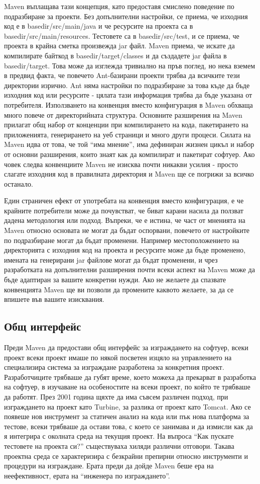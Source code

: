 Maven въплащава тази концепция, като предоставя смислено поведение по
подразбиране за проекти. Без допълнителни настройки, се приема, че
изходния код е в basedir/src/main/java и че ресурсите на проекта са в 
basedir/src/main/resources. Тестовете са в basedir/src/test, и се
приема, че проекта в крайна сметка произвежда jar файл. Maven приема,
че искате да компилирате байткод в basedir/target/classes и да
създадете jar файла в basedir/target. Това може да изглежда тривиално
на пръв поглед, но нека вземем в предвид факта, че повечето
Ant-базирани проекти трябва да всичките тези директории изрично. Ant
няма настройки по подразбиране за това къде да бъде изходния код или
ресурсите - цялата тази информация трябва да бъде указана от
потребителя. Използването на конвенция вместо конфигурация в Maven
обхваща много повече от директорийната структура. Основните разширения
на Maven прилагат общ набор от конценции при компилирането на кода,
пакетирането на приложенията, генерирането на уеб страници и много
други процеси. Силата на Maven идва от това, че той "`има мнение"',
има дефиниран жизнен цикъл и набор от основни разширения, които знаят
как да компилират и пакетират софтуер. Ако човек следва конвенциите
Maven не изисква почти никакви усилия - просто слагате изходния код в
правилната директория и Maven ще се погрижи за всичко останало.

Един страничен ефект от употребата на конвенция вместо конфигурация, е
че крайните потребители може да почувстват, че биват карани насила да
ползват дадена методология или подход. Въпреки, че е истина, че част
от мненията на Maven относно основата не могат да бъдат оспорвани,
повечето от настройките по подразбиране могат да бъдат
променени. Например местоположението на директорията с изходния код на
проекта и ресурсите може да бъде променено, имената на генерирани jar
файлове могат да бъдат променени, и чрез разработката на допълнителни
разширения почти всеки аспект на Maven може да бъде адаптиран за
вашите конкретни нужди. Ако не желаете да спазвате конвенцията Maven
ще ви позволи да промените каквото желаете, за да се впишете във
вашите изисквания. 
\subsection{Общ интерфейс}
Преди Maven да предостави общ интерфейс за изграждането на софтуер,
всеки проект всеки проект имаше по някой посветен изцяло на
управлението на специализира система за изграждане разработена за
конкретния проект. Разработчиците трябваше да губят време, което
можеха да прекарват в разработка на софтуер, в изучаване на
особеностите на всеки проект, по който те трябваше да работят. През
2001 година щяхте да има съвсем различен подход, при изграждането на
проект като Turbine, за разлика от проект като Tomcat. Ако се появеше
нов инструмент за статичен анализ на кода или пък нова платформа за
тестове, всеки трябваше да остави това, с което се занимава и да
измисли как да я интегрира с околната среда на текущия проект. На
въпроса "`Как пускате тестовете на проекта си?"' съществуваха хиляди
различни отговори. Такава проектна среда се характеризира с безкрайни
препирни относно инструменти и процедури на изграждане. Ерата преди да
дойде Maven беше ера на неефективност, ерата на "`инженера по
изграждането"'.


